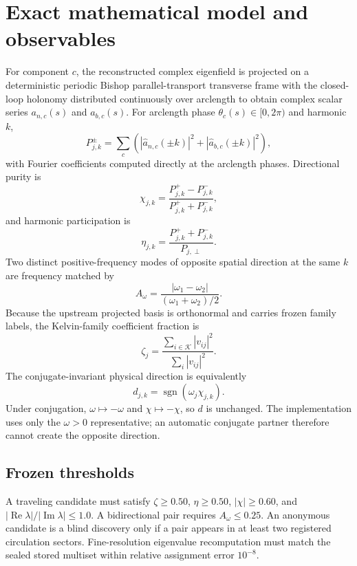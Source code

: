 \documentclass[11pt,a4paper]{article}
\begin{document}
\section{Exact mathematical model and observables}
For component $c$, the reconstructed complex eigenfield is projected on a deterministic periodic Bishop parallel-transport transverse frame with the closed-loop holonomy distributed continuously over arclength to obtain complex scalar series $a_{n,c}(s)$ and $a_{b,c}(s)$. For arclength phase $\theta_c(s)\in[0,2\pi)$ and harmonic $k$,
\begin{equation}
P_{j,k}^{\pm}=\sum_c\left(|\widehat a_{n,c}(\pm k)|^2+|\widehat a_{b,c}(\pm k)|^2\right),
\label{eq:E1}
\end{equation}
with Fourier coefficients computed directly at the arclength phases. Directional purity is
\begin{equation}
\chi_{j,k}=\frac{P_{j,k}^{+}-P_{j,k}^{-}}{P_{j,k}^{+}+P_{j,k}^{-}},
\label{eq:E2}
\end{equation}
and harmonic participation is
\begin{equation}
\eta_{j,k}=\frac{P_{j,k}^{+}+P_{j,k}^{-}}{P_{j,\perp}}.
\label{eq:E3}
\end{equation}
Two distinct positive-frequency modes of opposite spatial direction at the same $k$ are frequency matched by
\begin{equation}
A_\omega=\frac{|\omega_1-\omega_2|}{(\omega_1+\omega_2)/2}.
\label{eq:E4}
\end{equation}
Because the upstream projected basis is orthonormal and carries frozen family labels, the Kelvin-family coefficient fraction is
\begin{equation}
\zeta_j=\frac{\sum_{i\in\mathcal K}|v_{ij}|^2}{\sum_i|v_{ij}|^2}.
\label{eq:E6}
\end{equation}
The conjugate-invariant physical direction is equivalently
\begin{equation}
d_{j,k}=\operatorname{sgn}(\omega_j\chi_{j,k}).
\label{eq:E5}
\end{equation}
Under conjugation, $\omega\mapsto-\omega$ and $\chi\mapsto-\chi$, so $d$ is unchanged. The implementation uses only the $\omega>0$ representative; an automatic conjugate partner therefore cannot create the opposite direction.

\subsection{Frozen thresholds}
A traveling candidate must satisfy $\zeta\ge0.50$, $\eta\ge0.50$, $|\chi|\ge0.60$, and $|\operatorname{Re}\lambda|/|\operatorname{Im}\lambda|\le1.0$. A bidirectional pair requires $A_\omega\le0.25$. An anonymous candidate is a blind discovery only if a pair appears in at least two registered circulation sectors. Fine-resolution eigenvalue recomputation must match the sealed stored multiset within relative assignment error $10^{-8}$.
\end{document}
